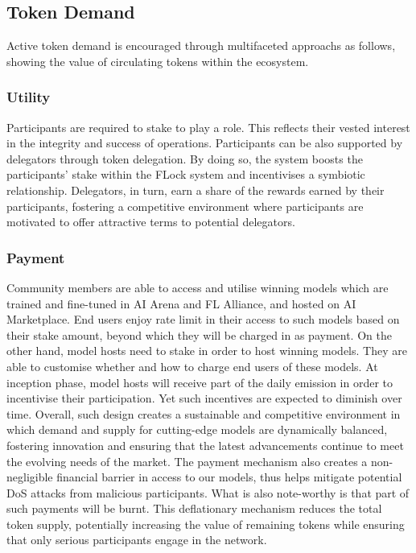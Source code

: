 \documentclass[conference]{IEEEtran}
\begin{document}
\subsection{Token Demand}
Active token demand is encouraged through multifaceted approachs as follows, showing the value of circulating tokens within the ecosystem.

\subsubsection{Utility}
Participants are required to stake \FML to play a role. This reflects their vested interest in the integrity and success of operations. Participants can be also supported by delegators through \FML token delegation. By doing so, the system  boosts the participants' stake within the FLock system and incentivises a symbiotic relationship. Delegators, in turn, earn a share of the rewards earned by their participants, fostering a competitive environment where participants are motivated to offer attractive terms to potential delegators.
 
     
\subsubsection{Payment} 
Community members are able to access and utilise winning models which are trained and fine-tuned in AI Arena and FL Alliance, and hosted on AI Marketplace. End users enjoy rate limit in their access to such models based on their stake amount, beyond which they will be charged in \FML as payment. On the other hand, model hosts need to stake \FML in order to host winning models. They are able to customise whether and how to charge end users of these models. At inception phase, model hosts will receive part of the daily emission in order to incentivise their participation. Yet such incentives are expected to diminish over time. Overall, such design creates a sustainable and competitive environment in which demand and supply for cutting-edge models are dynamically balanced, fostering innovation and ensuring that the latest advancements continue to meet the evolving needs of the market. The payment mechanism also creates a non-negligible financial barrier in access to our models, thus helps mitigate potential DoS attacks from malicious participants. What is also note-worthy is that part of such payments will be burnt. This deflationary mechanism reduces the total token supply, potentially increasing the value of remaining tokens while ensuring that only serious participants engage in the network.
\end{document}
